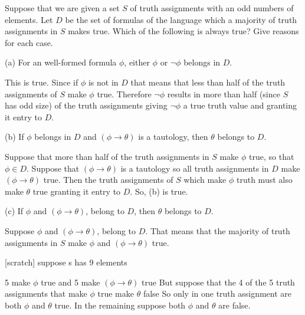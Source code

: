 \documentclass{article}
\theoremstyle{remark}\newtheorem{remark}{Remark}
\begin{document}
Suppose that we are given a set $S$ of truth assignments with an odd numbers of elements. Let $D$ be the set of formulas of the language which a majority of truth assignments in $S$ makes true. Which of the following is always true? Give reasons for each case.

(a) For an well-formed formula $\phi$, either $\phi$ or $\neg\phi$ belongs in $D$.


This is true. Since if $\phi$ is not in $D$ that means that less than half of the truth assignments of $S$ make $\phi$ true. Therefore $\neg\phi$ results in more than half (since $S$ has odd size) of the truth assignments giving $\neg\phi$ a true truth value and granting it entry to $D$.

(b) If $\phi$ belongs in $D$ and $(\phi \to \theta)$ is a tautology, then $\theta$ belongs to $D$.

Suppose that more than half of the truth assignments in $S$ make $\phi$ true, so that $\phi \in D$.
Suppose that $(\phi \to \theta)$ is a tautology so all truth assignments in $D$ make $(\phi \to \theta)$ true.
Then the truth assignments of $S$ which make $\phi$ truth must also make $\theta$ true granting it entry to $D$. So, (b) is true.

(c) If $\phi$ and $(\phi \to \theta)$, belong to $D$, then $\theta$ belongs to $D$.

Suppose $\phi$ and $(\phi \to \theta)$, belong to $D$.
That means that the majority of truth assignments in $S$ make $\phi$ and $(\phi \to \theta)$ true.


[scratch]
suppose s has 9 elements

5 make $\phi$ true and 5 make $(\phi \to \theta)$ true
But suppose that the 4 of the 5 truth assignments that make $\phi$ true make $\theta$ false
So only in one truth assignment are both $\phi$ and $\theta$ true.
In the remaining suppose both $\phi$ and $\theta$ are false.
\end{document}
